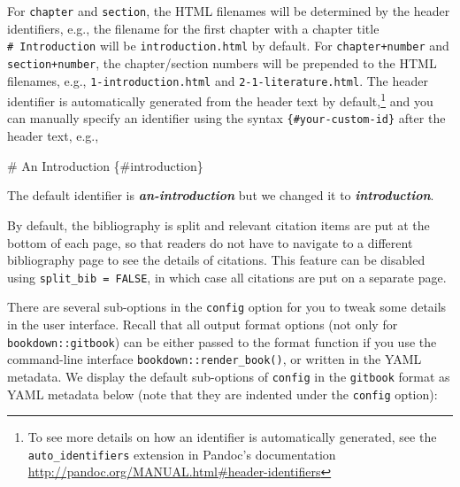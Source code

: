 \documentclass[
  12pt,
]{krantz}
\newenvironment{Shaded}{\begin{snugshade}}{\end{snugshade}}
\newcommand{\FunctionTok}[1]{\textcolor[rgb]{0.00,0.00,0.00}{#1}}
\newcommand{\InformationTok}[1]{\textcolor[rgb]{0.56,0.35,0.01}{\textbf{\textit{#1}}}}
\newcommand{\NormalTok}[1]{#1}
\theoremstyle{definition}
\theoremstyle{definition}
\theoremstyle{definition}
\theoremstyle{definition}
\theoremstyle{remark}
\begin{document}
For \texttt{chapter} and \texttt{section}, the HTML filenames will be determined by the header identifiers, e.g., the filename for the first chapter with a chapter title \texttt{\#\ Introduction} will be \texttt{introduction.html} by default. For \texttt{chapter+number} and \texttt{section+number}, the chapter/section numbers will be prepended to the HTML filenames, e.g., \texttt{1-introduction.html} and \texttt{2-1-literature.html}. The header identifier is automatically generated from the header text by default,\footnote{To see more details on how an identifier is automatically generated, see the \texttt{auto\_identifiers} extension in Pandoc's documentation \url{http://pandoc.org/MANUAL.html\#header-identifiers}} and you can manually specify an identifier using the syntax \texttt{\{\#your-custom-id\}} after the header text, e.g.,

\begin{Shaded}
\begin{Highlighting}[]
\FunctionTok{\# An Introduction \{\#introduction\}}

\NormalTok{The default identifier is }\InformationTok{\textasciigrave{}an{-}introduction\textasciigrave{}}\NormalTok{ but we changed}
\NormalTok{it to }\InformationTok{\textasciigrave{}introduction\textasciigrave{}}\NormalTok{.}
\end{Highlighting}
\end{Shaded}

By default, the bibliography is split and relevant citation items are put at the bottom of each page, so that readers do not have to navigate to a different bibliography page to see the details of citations. This feature can be disabled using \texttt{split\_bib\ =\ FALSE}, in which case all citations are put on a separate page.

There are several sub-options in the \texttt{config} option for you to tweak some details in the user interface. Recall that all output format options (not only for \texttt{bookdown::gitbook}) can be either passed to the format function if you use the command-line interface \texttt{bookdown::render\_book()}, or written in the YAML metadata. We display the default sub-options of \texttt{config} in the \texttt{gitbook} format as YAML metadata below (note that they are indented under the \texttt{config} option):
\end{document}
